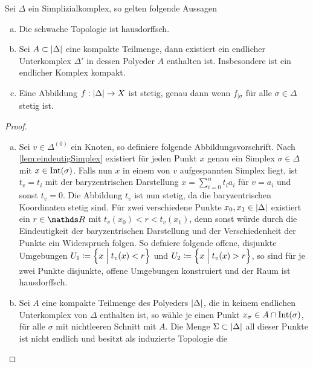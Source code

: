 \begin{Satz}
  Sei $\Delta$ ein Simplizialkomplex, so gelten folgende Aussagen
  \begin{enumerate}[(a)]
        \item Die schwache Topologie ist hausdorffsch.
        \item Sei $A \subset \left| \Delta \right|$ eine kompakte Teilmenge,
          dann existiert ein endlicher Unterkomplex $\Delta'$ in
          dessen Polyeder $A$ enthalten ist. Insbesondere ist ein
          endlicher Komplex kompakt.
        \item Eine Abbildung $f: \left| \Delta \right| \rightarrow X$ ist
          stetig, genau dann wenn $f_{| \sigma}$ für alle
          $\sigma \in \Delta$ stetig ist.
	\end{enumerate}
	\begin{proof}
          \begin{enumerate}[(a)]
          \item Sei $v \in \Delta^{(0)}$ ein Knoten, so definiere
            folgende Abbildungsvorschrift.  Nach
            \cref{lem:eindeutigSimplex} existiert für jeden Punkt $x$
            genau ein Simplex $\sigma \in \Delta$ mit
            $x \in \operatorname{Int}(\sigma)$. Falls nun $x$ in einem von $v$
            aufgespannten Simplex liegt, ist $t_v = t_i$ mit der
            baryzentrischen Darstellung $x = \sum^{n}_{i=0} t_i a_i$
            für $v=a_i $ und sonst $t_v = 0$.  Die Abbildung $t_v$ ist
            nun stetig, da die baryzentrischen Koordinaten stetig
            sind. Für zwei verschiedene Punkte
            $x_0,x_1 \in \left| \Delta \right|$ existiert ein $r \in \R$ mit
            $t_v(x_0) < r < t_v(x_1)$, denn sonst würde durch die
            Eindeutigkeit der baryzentrischen Darstellung und der
            Verschiedenheit der Punkte ein Widerspruch folgen. So
            defniere folgende offene, disjunkte Umgebungen
            $U_1 \coloneqq \left\{ x \; \Big| \;  t_v(x)<r \right\}$ und
            $U_2 \coloneqq \left\{ x \; \Big| \;  t_v(x)>r \right\}$, so sind für je zwei
            Punkte disjunkte, offene Umgebungen konstruiert und der
            Raum ist hausdorffsch.
          \item Sei $A$ eine kompakte Teilmenge des Polyeders
            $\left| \Delta \right|$, die in keinem endlichen Unterkomplex von
            $\Delta$ enthalten ist, so wähle je einen Punkt
            $x_\sigma \in A \cap \operatorname{Int}(\sigma)$, für alle $\sigma$ mit
            nichtleeren Schnitt mit $A$. Die Menge
            $\Sigma \subset \left| \Delta \right|$ all dieser Punkte ist nicht
            endlich und besitzt als induzierte Topologie die

\end{enumerate}
\end{proof}
\end{Satz}
